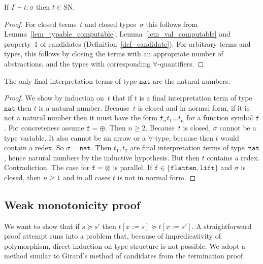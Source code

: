 \documentclass[a4paper,UKenglish,cleveref,autoref,numberwithinsect]{lipics-v2019}
\theoremstyle{definition}
\newcommand{\subst}[2]{#1:=#2}
\newcommand{\nat}{\mathtt{nat}}
\newcommand{\flatten}{\mathtt{flatten}}
\newcommand{\lift}{\mathtt{lift}}
\newcommand{\SN}{\mathrm{SN}}
\newcommand{\proves}{\vdash}
\begin{document}
{ \renewcommand{\thetheorem}{\ref{thm_sn}}
\begin{theorem}
  If $\Gamma \proves t : \sigma$ then $t \in \SN$.
\end{theorem}
\addtocounter{theorem}{-1}}

\begin{proof}
  For closed terms~$t$ and closed types~$\sigma$ this follows from
  Lemma~\ref{lem_typable_computable}, Lemma~\ref{lem_val_computable}
  and property~1 of candidates (Definition~\ref{def_candidate}). For
  arbitrary terms and types, this follows by closing the terms with an
  appropriate number of abstractions, and the types with corresponding
  $\forall$-quantifiers.
\end{proof}

{ \renewcommand{\thelemma}{\ref{lem_final_nat}}
\begin{lemma}
  The only final interpretation terms of type $\nat$ are the natural
  numbers.
\end{lemma}
\addtocounter{theorem}{-1}}

\begin{proof}
  We show by induction on~$t$ that if $t$ is a final interpretation
  term of type~$\nat$ then $t$ is a natural number. Because~$t$ is
  closed and in normal form, if it is not a natural number then it
  must have the form $\mathtt{f}_\sigma t_1 \ldots t_n$ for a function
  symbol $\mathtt{f}$. For concreteness assume $\mathtt{f} =
  \oplus$. Then $n \ge 2$. Because~$t$ is closed, $\sigma$ cannot be a
  type variable. It also cannot be an arrow or a $\forall$-type,
  because then $t$ would contain a redex. So $\sigma=\nat$. Then
  $t_1,t_2$ are final interpretation terms of type~$\nat$, hence
  natural numbers by the inductive hypothesis. But then $t$ contains a
  redex. Contradiction.
  The case for $\mathtt{f} = \otimes$ is parallel.  If
  $\mathtt{f} \in \{\flatten,\lift\}$ and $\sigma$ is closed, then
  $n \ge 1$ and in all cases $t$ is not in normal form.
\end{proof}

\subsection{Weak monotonicity proof}\label{sec_weakly_monotone_proof}

We want to show that if $s \succeq s'$ then $t[\subst{x}{s}] \succeq
t[\subst{x}{s'}]$. A straightforward proof attempt runs into a problem
that, because of impredicativity of polymorphism, direct induction on
type structure is not possible. We adopt a method similar to Girard's
method of candidates from the termination proof.
\end{document}

